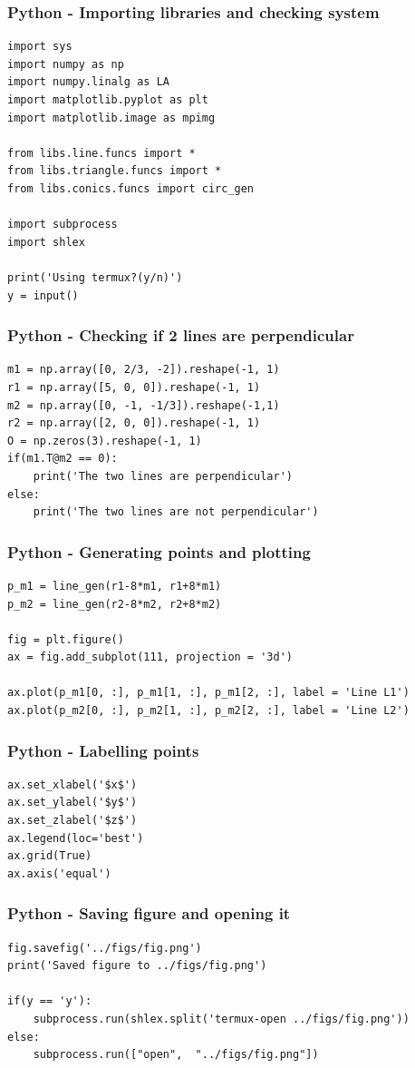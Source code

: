 \documentclass{beamer}
\begin{document}
\begin{frame}[fragile]
    \frametitle{Python - Importing libraries and checking system}
    \begin{lstlisting}
import sys
import numpy as np
import numpy.linalg as LA
import matplotlib.pyplot as plt
import matplotlib.image as mpimg

from libs.line.funcs import *
from libs.triangle.funcs import *
from libs.conics.funcs import circ_gen

import subprocess
import shlex

print('Using termux?(y/n)')
y = input()
\end{lstlisting}
\end{frame}

\begin{frame}[fragile]
    \frametitle{Python - Checking if 2 lines are perpendicular}
    \begin{lstlisting}
m1 = np.array([0, 2/3, -2]).reshape(-1, 1)
r1 = np.array([5, 0, 0]).reshape(-1, 1)
m2 = np.array([0, -1, -1/3]).reshape(-1,1)
r2 = np.array([2, 0, 0]).reshape(-1, 1)
O = np.zeros(3).reshape(-1, 1)
if(m1.T@m2 == 0):
    print('The two lines are perpendicular')
else:
    print('The two lines are not perpendicular')
\end{lstlisting}
\end{frame}

\begin{frame}[fragile]
    \frametitle{Python - Generating points and plotting}
    \begin{lstlisting}
p_m1 = line_gen(r1-8*m1, r1+8*m1)
p_m2 = line_gen(r2-8*m2, r2+8*m2)

fig = plt.figure()
ax = fig.add_subplot(111, projection = '3d')

ax.plot(p_m1[0, :], p_m1[1, :], p_m1[2, :], label = 'Line L1')
ax.plot(p_m2[0, :], p_m2[1, :], p_m2[2, :], label = 'Line L2')
\end{lstlisting}
\end{frame}

\begin{frame}[fragile]
    \frametitle{Python - Labelling points}
    \begin{lstlisting}
ax.set_xlabel('$x$')
ax.set_ylabel('$y$')
ax.set_zlabel('$z$')
ax.legend(loc='best')
ax.grid(True) 
ax.axis('equal')
    \end{lstlisting}
\end{frame}

\begin{frame}[fragile]
    \frametitle{Python - Saving figure and opening it}
    \begin{lstlisting}
fig.savefig('../figs/fig.png')
print('Saved figure to ../figs/fig.png')

if(y == 'y'):
    subprocess.run(shlex.split('termux-open ../figs/fig.png'))
else:
    subprocess.run(["open",  "../figs/fig.png"])
    \end{lstlisting}
\end{frame}
\end{document}
